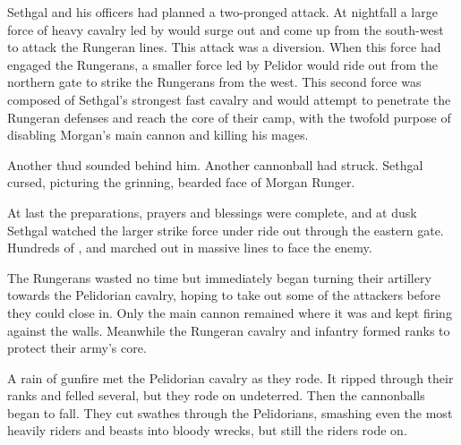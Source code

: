 Sethgal and his officers had planned a two-pronged attack. 
At nightfall a large force of heavy cavalry led by \rah[\Theal] \Kintaer would surge out and come up from the south-west to attack the Rungeran lines. 
This attack was a diversion. 
When this force had engaged the Rungerans, a smaller force led by \rah[\Dornaer] Pelidor would ride out from the northern gate to strike the Rungerans from the west. 
This second force was composed of Sethgal's strongest fast cavalry and would attempt to penetrate the Rungeran defenses and reach the core of their camp, with the twofold purpose of disabling Morgan's main cannon and killing his mages. 

Another thud sounded behind him.
Another cannonball had struck. 
Sethgal cursed, picturing the grinning, bearded face of Morgan Runger. 





\begin{comment}
  \subsection{Kintaer rides out}
\end{comment}
At last the preparations, prayers and blessings were complete, and at dusk Sethgal watched the larger strike force under \rah[\Theal] \Kintaer ride out through the eastern gate. 
Hundreds of \relcs, \grulcans and \murocs marched out in massive lines to face the enemy. 

The Rungerans wasted no time but immediately began turning their artillery towards the Pelidorian cavalry, hoping to take out some of the attackers before they could close in. 
Only the main cannon remained where it was and kept firing against the walls. 
Meanwhile the Rungeran cavalry and infantry formed ranks to protect their army's core.

A rain of gunfire met the Pelidorian cavalry as they rode.
It ripped through their ranks and felled several, but they rode on undeterred. 
Then the cannonballs began to fall. 
They cut swathes through the Pelidorians, smashing even the most heavily \armoured riders and beasts into bloody wrecks, but still the riders rode on. 


